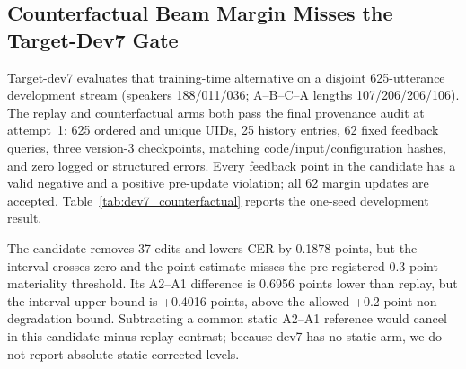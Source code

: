 \subsection{Counterfactual Beam Margin Misses the Target-Dev7 Gate}

Target-dev7 evaluates that training-time alternative on a disjoint 625-utterance development stream (speakers 188/011/036; A--B--C--A lengths 107/206/206/106). The replay and counterfactual arms both pass the final provenance audit at attempt~1: 625 ordered and unique UIDs, 25 history entries, 62 fixed feedback queries, three version-3 checkpoints, matching code/input/configuration hashes, and zero logged or structured errors. Every feedback point in the candidate has a valid negative and a positive pre-update violation; all 62 margin updates are accepted. Table~\ref{tab:dev7_counterfactual} reports the one-seed development result.

\begin{table}[t]
\centering
\caption{Target-dev7 matched component audit (development-only). CER and forgetting intervals use 10,000 utterance-paired bootstrap replicates; the violation interval resamples the 62 paired pre/post query diagnostics.}
\label{tab:dev7_counterfactual}
\end{table}

The candidate removes 37 edits and lowers CER by 0.1878 points, but the interval crosses zero and the point estimate misses the pre-registered 0.3-point materiality threshold. Its A2--A1 difference is 0.6956 points lower than replay, but the interval upper bound is +0.4016 points, above the allowed +0.2-point non-degradation bound. Subtracting a common static A2--A1 reference would cancel in this candidate-minus-replay contrast; because dev7 has no static arm, we do not report absolute static-corrected levels.

